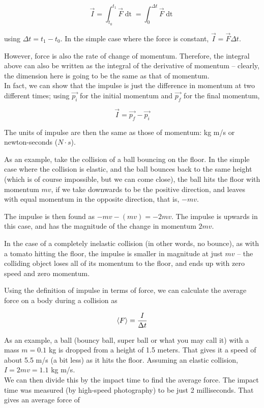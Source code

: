 \documentclass[12pt,a4paper]{report}
\begin{document}
\begin{equation}
\vec{I} = \int_{t_0}^{t_1} \vec{F} \mathop{dt} = \int_0^{\Delta t} \vec{F} \mathop{dt}
\end{equation}

using $\Delta t = t_1 - t_0$. In the simple case where the force is constant, $\vec{I} = \vec{F} \Delta t$.

However, force is also the rate of change of momentum. Therefore, the integral above can also be written as the integral of the derivative of momentum -- clearly, the dimension here is going to be the same as that of momentum.\\
In fact, we can show that the impulse is just the difference in momentum at two different times; using $\vec{p_i}$ for the initial momentum and $\vec{p_f}$ for the final momentum, 

\begin{equation}
\vec{I} = \vec{p_f} - \vec{p_i}
\end{equation}

The units of impulse are then the same as those of momentum: kg m/s or newton-seconds ($N \cdot s$).

As an example, take the collision of a ball bouncing on the floor. In the simple case where the collision is elastic, and the ball bounces back to the same height (which is of course impossible, but we can come close), the ball hits the floor with momentum $m v$, if we take downwards to be the positive direction, and leaves with equal momentum in the opposite direction, that is, $- m v$.

The impulse is then found as $- mv - (mv) = - 2 m v$. The impulse is upwards in this case, and has the magnitude of the change in momentum $2 m v$.

In the case of a completely inelastic collision (in other words, no bounce), as with a tomato hitting the floor, the impulse is smaller in magnitude at just $m v$ -- the colliding object loses all of its momentum to the floor, and ends up with zero speed and zero momentum.

Using the definition of impulse in terms of force, we can calculate the average force on a body during a collision as

\begin{equation}
\Braket{F} = \frac{I}{\Delta t}
\end{equation}

As an example, a ball (bouncy ball, super ball or what you may call it) with a mass $m = 0.1$ kg is dropped from a height of 1.5 meters. That gives it a speed of about 5.5 m/s (a bit less) as it hits the floor. Assuming an elastic collision, $I = 2 m v = 1.1$ kg m/s.\\
We can then divide this by the impact time to find the average force. The impact time was measured (by high-speed photography) to be just 2 milliseconds. That gives an average force of
\end{document}

